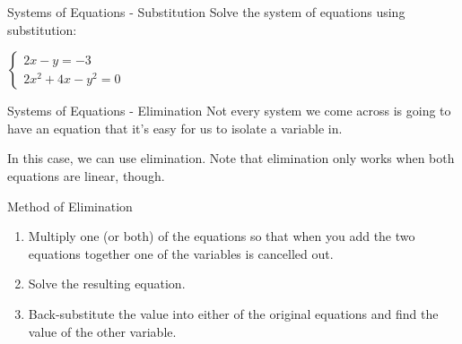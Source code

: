 \documentclass[t, aspectratio=169]{beamer}
\begin{document}
	\begin{frame}{Systems of Equations - Substitution}
		Solve the system of equations using substitution:
		
		$\begin{cases}
		2x - y = -3 \\
		2x^2 + 4x - y^2 = 0
		\end{cases}$
		
		 \begin{flalign*}
		\end{flalign*}
	\end{frame}

	\begin{frame}{Systems of Equations - Elimination}
		Not every system we come across is going to have an equation that it's easy for us to isolate a variable in. \pause
		
		In this case, we can use elimination. Note that elimination only works when both equations are linear, though. \pause
		
		\begin{block}{Method of Elimination}
			\begin{enumerate}[1)]
				\item Multiply one (or both) of the equations so that when you add the two equations together one of the variables is cancelled out.
				\item Solve the resulting equation.
				\item Back-substitute the value into either of the original equations and find the value of the other variable.
			\end{enumerate}
		\end{block}
	\end{frame}
\end{document}
